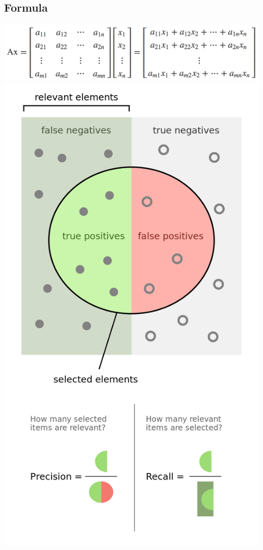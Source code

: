 \subsection*{Formula}
\includegraphics[width=\linewidth]{matmul.png}
\includegraphics[width=\linewidth]{precisionrecall.png}


